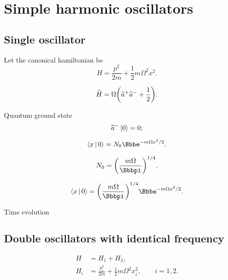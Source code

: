 \section{Simple harmonic oscillators}

\subsection{Single oscillator}
Let the canonical hamiltonian be
\begin{equation}
H = \frac{p^2}{2m} + \frac{1}{2}m\Omega^2 x^2.
\end{equation}

\begin{equation}
\widehat{H} = \Omega{\left(\widehat{a}^+\widehat{a}^- + \frac{1}{2}\right)}.
\end{equation}

\begin{nameddef}{Quantum ground state}
\begin{equation}
\widehat{a}^-\Ket{0} = 0;
\end{equation}

\begin{equation}
\Braket{x | 0} = N_0 \ee^{-m\Omega x^2/2}.
\end{equation}

\begin{equation}
N_0 = \rbr{\frac{m\Omega}{\pp}}^{1/4}.
\end{equation}

\begin{equation}
\Braket{x | 0} = \rbr{\frac{m\Omega}{\pp}}^{1/4} \ee^{-m\Omega x^2/2}.
\end{equation}

\end{nameddef} %



\begin{nameddef}{Time evolution}

\end{nameddef} %


\subsection{Double oscillators with identical frequency}

\begin{align}
H &= H_1 + H_2, \\
H_i &= \frac{p_i^2}{2m} + \frac{1}{2}m\Omega^2 x_i^2,\qquad i = 1, 2.
\end{align}

